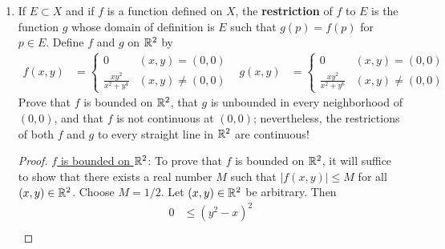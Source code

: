 \documentclass[../psets.tex]{subfiles}
\begin{document}
\begin{enumerate}[label={\textbf{\arabic*.}}]
\begin{proof}
        Now suppose that $G$ is compact. To prove that $f$ is continuous, the Corollary to Theorem 4.8 tells us that it will suffice to show that for every closed set $C$ in $Y$, $f^{-1}(C)$ is closed in $X$. Let $C$ be an arbitrary closed set in $Y$. Define $\pi_1:G\to X$ and $\pi_2:G\to Y$ by
        \begin{align*}
            \pi_1(x,f(x)) &= x&
            \pi_2(x,f(x)) &= f(x)
        \end{align*}
        We can prove that $\pi_1,\pi_2$ are continuous by choosing $\delta=\epsilon$ in the definition of continuity. It follows by the Corollary to Theorem 4.8 that $\pi_2^{-1}(C)$ is closed in $G$. This combined with the fact that $G$ is compact implies that $\pi_2^{-1}(C)$ is compact. This combined with the fact that $\pi_1$ is continuous implies by Theorem 4.14 that $\pi_1(\pi_2^{-1}(C))=f^{-1}(C)$ is compact. Thus, by Theorem 2.34, $f^{-1}(C)$ is closed, as desired.
    \end{proof}
    \item If $E\subset X$ and if $f$ is a function defined on $X$, the \textbf{restriction} of $f$ to $E$ is the function $g$ whose domain of definition is $E$ such that $g(p)=f(p)$ for $p\in E$. Define $f$ and $g$ on $\mathbb{R}^2$ by
    \begin{align*}
        f(x,y) &=
        \begin{cases}
            0 & (x,y)=(0,0)\\
            \frac{xy^2}{x^2+y^4} & (x,y)\neq(0,0)
        \end{cases}&
        g(x,y) &=
        \begin{cases}
            0 & (x,y)=(0,0)\\
            \frac{xy^2}{x^2+y^6} & (x,y)\neq(0,0)
        \end{cases}
    \end{align*}
    Prove that $f$ is bounded on $\mathbb{R}^2$, that $g$ is unbounded in every neighborhood of $(0,0)$, and that $f$ is not continuous at $(0,0)$; nevertheless, the restrictions of both $f$ and $g$ to every straight line in $\mathbb{R}^2$ are continuous!
    \begin{proof}
        \underline{$f$ is bounded on $\mathbb{R}^2$}: To prove that $f$ is bounded on $\mathbb{R}^2$, it will suffice to show that there exists a real number $M$ such that $|f(x,y)|\leq M$ for all $(x,y)\in\mathbb{R}^2$. Choose $M=1/2$. Let $(x,y)\in\mathbb{R}^2$ be arbitrary. Then
        \begin{align*}
            0 &\leq (y^2-x)^2\\

\end{align*}
\end{proof}
\end{enumerate}
\end{document}
